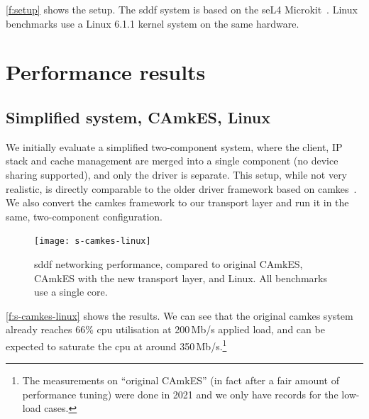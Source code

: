 \documentclass[a4paper,12pt]{report}
\begin{document}
\autoref{f:setup} shows the setup.
The \gls{sddf} system is based on the seL4 Microkit~\citep{microkit:url}.
Linux benchmarks use a Linux 6.1.1 kernel system on the same hardware.

\section{Performance results}

\subsection{Simplified system, CAmkES, Linux}\label{s:p-camkes}

We initially evaluate a simplified two-component system, where the
client, IP stack and cache management are merged into a single component (no device
sharing supported), and only the
driver is separate. This setup, while not very realistic, is directly
comparable to the older driver framework based on
\gls{camkes}~\citep{Kuz_LGH_07}. We also convert the
\gls{camkes} framework to our transport layer and run it in the same,
two-component configuration.

\begin{figure}[th]
  \centering
  \texttt{[image: s-camkes-linux]}
  \caption[\gls{sddf} networking performance compared to other systems
  running single-core.]{\gls{sddf} networking performance, compared to original CAmkES,
    CAmkES with the new transport layer, and Linux. All benchmarks use
    a single core.}
  \label{f:s-camkes-linux}
\end{figure}

\autoref{f:s-camkes-linux} shows the results. We can see that the
original \gls{camkes} system already reaches 66\% \gls{cpu} utilisation at
200\,Mb/s applied load, and can be expected to saturate the \gls{cpu} at
around 350\,Mb/s.\footnote{The measurements on ``original CAmkES''
  (in fact after a fair amount of performance tuning) were done in 2021
  and we only have records for the low-load cases.}
\end{document}
